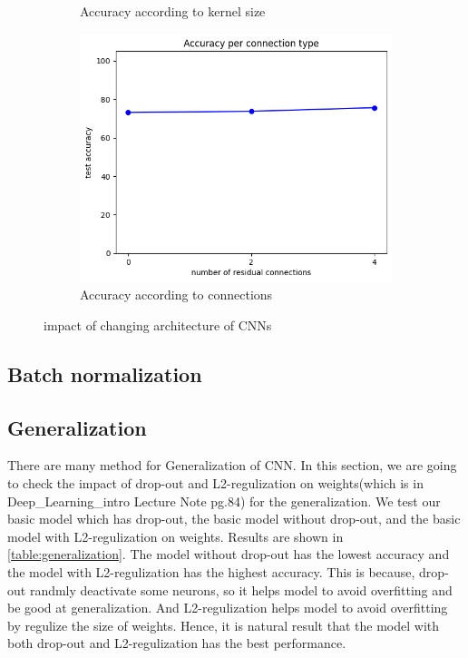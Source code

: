 \begin{figure}[htbp]
\begin{subfigure}[t]{0.3\linewidth}
		\caption{Accuracy according to kernel size}
		\label{fig:q4-2-kernel}
	\end{subfigure}%
    \hfill
	\begin{subfigure}[t]{0.3\linewidth}
		\centering
		\includegraphics[width=\linewidth]{image/q4-2-connection.png}
		\caption{Accuracy according to connections}
		\label{fig:q4-2-connection}
	\end{subfigure}

	\caption{impact of changing architecture of CNNs}
	\label{fig:cnn_architecture}
\end{figure}

\subsection{Batch normalization}

\subsection{Generalization}
There are many method for Generalization of CNN. In this section, we are going to check the impact of drop-out and L2-regulization on weights(which is in Deep\_Learning\_intro Lecture Note pg.84) for the generalization.
We test our basic model which has drop-out, the basic model without drop-out, and the basic model with L2-regulization on weights.
Results are shown in \cref{table:generalization}. The model without drop-out has the lowest accuracy and the model with L2-regulization has the highest accuracy. 
This is because, drop-out randmly deactivate some neurons, so it helps model to avoid overfitting and be good at generalization. And L2-regulization helps model to avoid overfitting by regulize the size of weights.
Hence, it is natural result that the model with both drop-out and L2-regulization has the best performance.

